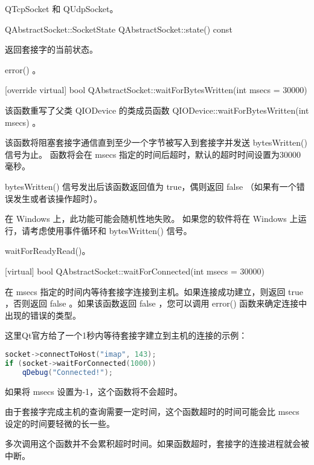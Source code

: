 \begin{seeAlso}
QTcpSocket 和 QUdpSocket。
\end{seeAlso}



QAbstractSocket::SocketState QAbstractSocket::state() const

返回套接字的当前状态。


\begin{seeAlso}
error() 。
\end{seeAlso}

[override virtual] bool QAbstractSocket::waitForBytesWritten(int msecs
= 30000)

该函数重写了父类 QIODevice 的类成员函数 QIODevice::waitForBytesWritten(int msecs) 。

该函数将阻塞套接字通信直到至少一个字节被写入到套接字并发送 bytesWritten() 信号为止。 函数将会在 msecs 指定的时间后超时，默认的超时时间设置为30000毫秒。

bytesWritten() 信号发出后该函数返回值为 true，偶则返回 false （如果有一个错误发生或者该操作超时）。

\begin{notice}
在 Windows 上，此功能可能会随机性地失败。 如果您的软件将在 Windows 上运行，请考虑使用事件循环和 bytesWritten() 信号。
\end{notice}

\begin{seeAlso}
waitForReadyRead()。
\end{seeAlso}

[virtual] bool QAbstractSocket::waitForConnected(int msecs = 30000)

在 msecs 指定的时间内等待套接字连接到主机。如果连接成功建立，则返回 true ，否则返回 false 。如果该函数返回 false ，您可以调用 error() 函数来确定连接中出现的错误的类型。

这里Qt官方给了一个1秒内等待套接字建立到主机的连接的示例：


\begin{lstlisting}[language=C++]
socket->connectToHost("imap", 143);
if (socket->waitForConnected(1000))
	qDebug("Connected!");
\end{lstlisting}

如果将 msecs 设置为-1，这个函数将不会超时。

\begin{notice}
由于套接字完成主机的查询需要一定时间，这个函数超时的时间可能会比 msecs 设定的时间要轻微的长一些。
\end{notice}


\begin{notice}
多次调用这个函数并不会累积超时时间。如果函数超时，套接字的连接进程就会被中断。
\end{notice}

